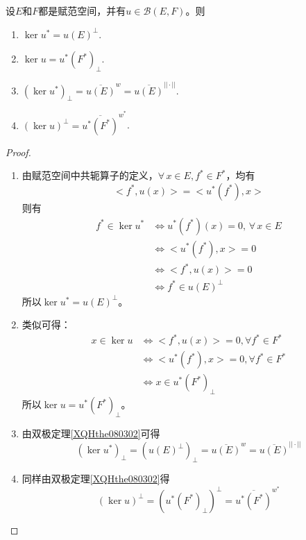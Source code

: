 \begin{theorem}[可能的考点]
    设$E$和$F$都是赋范空间，并有$u\in \mathcal{B}(E,F)$。则
    \begin{enumerate}
        \item $\ker u^{*}=u(E)^{\perp}$.
        \item $\ker u=u^{*}(F^{*})_{\perp}$.
        \item $(\ker u^{*})_{\perp}=\overline{u(E)}^{w}=\overline{u(E)}^{||\cdot||}$.
        \item $(\ker u)^{\perp}=\overline{u^{*}(F^{*})}^{w^{*}}$.
    \end{enumerate}
\end{theorem}

\begin{proof}
    \begin{enumerate}
        \item 由赋范空间中共轭算子的定义，$\forall \, x\in E,f^{*}\in F^{*}$，均有
        \begin{equation*}
            <f^{*},u(x)>=<u^{*}(f^{*}),x>
        \end{equation*}
        则有
        \begin{equation*}
            \begin{aligned}
                f^{*}\in \ker u^{*}&\Leftrightarrow u^{*}(f^{*})(x)=0,\,\forall \,x\in E\\
                &\Leftrightarrow <u^{*}(f^{*}),x>=0\\
                &\Leftrightarrow <f^{*},u(x)>=0\\
                &\Leftrightarrow f^{*}\in u(E)^{\perp}
            \end{aligned}
        \end{equation*}
        所以$\ker u^{*}=u(E)^{\perp }$。
        \item 类似可得：
        \begin{equation*}
            \begin{aligned}
            x\in \ker u&\Leftrightarrow <f^{*},u(x)>=0,\forall f^{*}\in F^{*}\\
            &\Leftrightarrow <u^{*}(f^{*}),x>=0,\forall f^{*}\in F^{*}\\
            &\Leftrightarrow x\in u^{*}(F^{*})_{\perp}     
            \end{aligned}
        \end{equation*}
        所以$\ker u=u^{*}(F^{*})_{\perp}$。
        \item 由双极定理\ref{XQHthe080302}可得
        \begin{equation*}
            (\ker u^{*})_{\perp}=(u(E)^{\perp})_{\perp}=\overline{u(E)}^{w}=\overline{u(E)}^{||\cdot||}
        \end{equation*}
        \item 同样由双极定理\ref{XQHthe080302}得
        \begin{equation*}
            (\ker u)^{\perp}=(u^{*}(F^{*})_{\perp})^{\perp}=\overline{u^{*}(F^{*})}^{w^{*}}
        \end{equation*}
    \end{enumerate}
\end{proof}